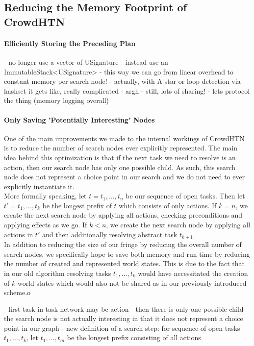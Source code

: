 \subsection{Reducing the Memory Footprint of CrowdHTN}

\paragraph{Efficiently Storing the Preceding Plan}
- no longer use a vector of USignature
- instead use an ImmutableStack<USignature>
- this way we can go from linear overhead to constant memory per search node!
- actually, with A star or loop detection via hashset it gets like, really complicated
- argh
- still, lots of sharing!
- lets protocol the thing (memory logging overall)

\paragraph{Only Saving 'Potentially Interesting' Nodes}
One of the main improvements we made to the internal workings of CrowdHTN is to reduce the number of search nodes ever explicitly represented. The main idea behind this optimization is that if the next task we need to resolve is an action, then our search node has only one possible child. As such, this search node does not represent a choice point in our search and we do not need to ever explicitly instantiate it. \\
More formally speaking, let $t = t_1, \ldots, t_n$ be our sequence of open tasks. Then let $t' = t_1, \ldots, t_k$ be the longest prefix of $t$ which consists of only actions. If $k = n$, we create the next search node by applying all actions, checking preconditions and applying effects as we go. If $k < n$, we create the next search node by applying all actions in $t'$ and then additionally resolving abstract task $t_{k+1}$. \\
In addition to reducing the size of our fringe by reducing the overall number of search nodes, we specifically hope to save both memory and run time by reducing the number of created and represented world states. This is due to the fact that in our old algorithm resolving tasks $t_1, \ldots, t_k$ would have necessitated the creation of $k$ world states which would also not be shared as in our previously introduced scheme.o

- first task in task network may be action
- then there is only one possible child
- the search node is not actually interesting in that it does not represent a choice point in our graph
- new definition of a search step: for sequence of open tasks $t_1, \ldots, t_k$, let $t_1, \ldots, t_m$ be the longest prefix consisting of all actions


